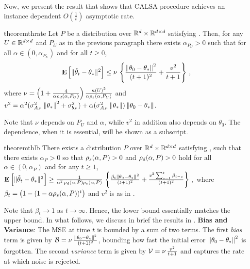 Now, we present the result that shows that CALSA procedure achieves an instance dependent $O(\frac{1}{t})$ asymptotic rate.
\fi
\begin{restatable}{theorem}{thrate}\label{th:rate}
Let $P$ be a distribution over $\mathbb{R}^d\times \mathbb{R}^{d \times d}$ satisfying .
Then, for any $U\in\mathbb{R}^{d \times d}$ and $P_U$ as in the previous paragraph there exists
$\alpha_{P_U}>0$ such that 
for all $\alpha\in (0,\alpha_{P_U})$ and for all $t\ge 0$,
\begin{align*}
\mathbf{E}\left[\| \hat{\theta}_t-\theta_*\|^2\right]
\leq
\nu\,
\left\{\frac{\left\| \theta_0-\theta_*\right\|^2}{(t+1)^2}+ \frac{v^2}{t+1} \right\}\,,
\end{align*}
where $\nu = \left(1+\tfrac4{\alpha\rho_d(\alpha,P_U)}\right)\tfrac{\kappa(U)^2}{\alpha \rho_s(\alpha,P_U)}$ and
$v^2 = 
\alpha^2(\sigma_{A_P}^2\left\| \theta_*\right\|^2+\sigma_{b_P}^2)+\alpha (\sigma_{A_P}^2\left\| \theta_*\right\|)\left\| \theta_0-\theta_*\right\|$.
\end{restatable}
Note that $\nu$ depends on $P_U$ and $\alpha$, while $v^2$ in addition also depends on $\theta_0$. The dependence,  when it is essential, will be shown as a subscript.

\begin{restatable}{theorem}{thlb}
\label{th:lb}
There exists a distribution $P$ over $\mathbb{R}^d\times \mathbb{R}^{d \times d}$ satisfying , such that
there exists $\alpha_P>0$ so that $\rho_s(\alpha,P)>0$ and $\rho_d(\alpha,P)>0$ hold for all $\alpha\in (0,\alpha_P)$ and
for any $t\ge 1$,  $\mathbf{E}\left[\| \hat{\theta}_t-\theta_*\|^2\right] 
\geq \frac{1}{\alpha^2 \, \rho_d(\alpha,P)\rho_s(\alpha,P)} \,\left\{ \frac{\beta_t \left\| \theta_0-\theta_*\right\|^2}{(t+1)^2} 
+ \frac{v^2\sum_{s=1}^t \beta_{t-s}  }{(t+1)^2} \right\}\,,$
where $\beta_{t} =  \big(1-(1-\alpha \rho_s(\alpha,P))^t\big)$ and $v^2$ is as in .
\end{restatable}
Note that $\beta_t \to 1$ as $t\to\infty$. Hence, the lower bound essentially matches the upper bound.
In what follows, we discuss in brief the results in . 
\textbf{Bias and Variance}: The MSE at time $t$ is bounded by a sum of two terms. The first \emph{bias} term is given by $\mathcal{B}=\nu \,\frac{\left\| \theta_0-\theta_*\right\|^2}{(t+1)^2}$, bounding how fast the initial error $\left\| \theta_0-\theta_*\right\|^2$ is forgotten. The second \emph{variance} term is given by $\mathcal{V}=\nu\, \frac{v^2}{t+1} $ and captures the rate at which noise is rejected. 

